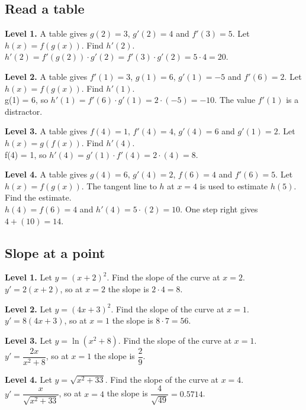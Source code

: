 \documentclass[11pt]{article}
\begin{document}
\subsection*{Read a table}
\noindent\textbf{Level 1.} A table gives $g(2)=3$, $g'(2)=4$ and $f'(3)=5$. Let $h(x)=f(g(x))$. Find $h'(2)$.\\  \quad $h'(2)=f'(g(2))\cdot g'(2)=f'(3)\cdot g'(2)=5\cdot4=20$.\par\medskip
\noindent\textbf{Level 2.} A table gives $f'(1)=3$, $g(1)=6$, $g'(1)=-5$ and $f'(6)=2$. Let $h(x)=f(g(x))$. Find $h'(1)$.\\  \quad g(1) = 6, so $h'(1)=f'(6)\cdot g'(1)=2\cdot(-5)=-10$. The value $f'(1)$ is a distractor.\par\medskip
\noindent\textbf{Level 3.} A table gives $f(4)=1$, $f'(4)=4$, $g'(4)=6$ and $g'(1)=2$. Let $h(x)=g(f(x))$. Find $h'(4)$.\\  \quad f(4) = 1, so $h'(4)=g'(1)\cdot f'(4)=2\cdot(4)=8$.\par\medskip
\noindent\textbf{Level 4.} A table gives $g(4)=6$, $g'(4)=2$, $f(6)=4$ and $f'(6)=5$. Let $h(x)=f(g(x))$. The tangent line to $h$ at $x=4$ is used to estimate $h(5)$. Find the estimate.\\  \quad $h(4)=f(6)=4$ and $h'(4)=5\cdot(2)=10$. One step right gives $4+(10)=14$.\par\medskip
\subsection*{Slope at a point}
\noindent\textbf{Level 1.} Let $y=(x+2)^{2}$. Find the slope of the curve at $x=2$.\\  \quad $y'=2(x+2)$, so at $x=2$ the slope is $2\cdot4=8$.\par\medskip
\noindent\textbf{Level 2.} Let $y=(4x+3)^{2}$. Find the slope of the curve at $x=1$.\\  \quad $y'=8(4x+3)$, so at $x=1$ the slope is $8\cdot7=56$.\par\medskip
\noindent\textbf{Level 3.} Let $y=\ln(x^{2}+8)$. Find the slope of the curve at $x=1$.\\  \quad $y'=\dfrac{2x}{x^{2}+8}$, so at $x=1$ the slope is $\dfrac{2}{9}$.\par\medskip
\noindent\textbf{Level 4.} Let $y=\sqrt{x^{2}+33}$. Find the slope of the curve at $x=4$.\\  \quad $y'=\dfrac{x}{\sqrt{x^{2}+33}}$, so at $x=4$ the slope is $\dfrac{4}{\sqrt{49}}=0.5714$.\par\medskip
\end{document}
